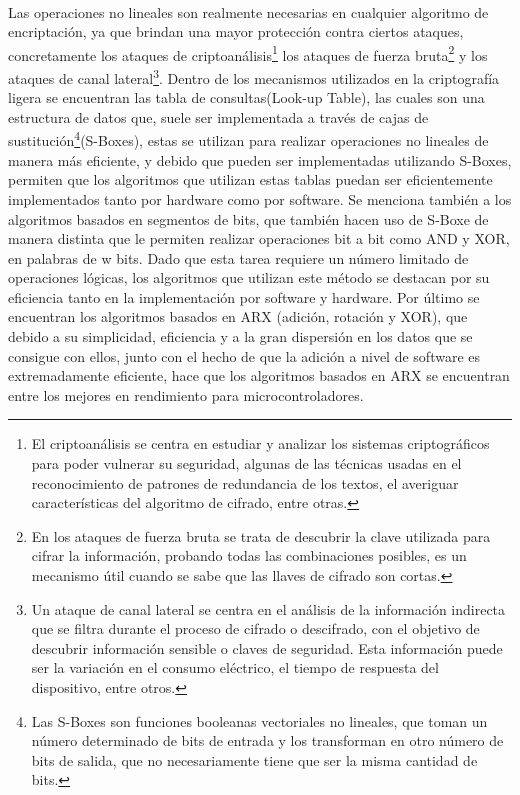 \documentclass[]{article}
\begin{document}
\\ Las operaciones no lineales son realmente necesarias en cualquier algoritmo de encriptación, ya que brindan una mayor protección contra ciertos ataques, concretamente los ataques de criptoanálisis\footnote{El criptoanálisis se centra en estudiar y analizar los sistemas criptográficos para poder vulnerar su seguridad, algunas de las técnicas usadas en el reconocimiento de patrones de redundancia de los textos, el averiguar características del algoritmo de cifrado, entre otras.} los ataques de fuerza bruta\footnote{En los ataques de fuerza bruta se trata de descubrir la clave utilizada para cifrar la información, probando todas las combinaciones posibles, es un mecanismo útil cuando se sabe que las llaves de cifrado son cortas.} y los ataques de canal lateral\footnote{Un ataque de canal lateral se centra en el análisis de la información indirecta que se filtra durante el proceso de cifrado o descifrado, con el objetivo de descubrir información sensible o claves de seguridad. Esta información puede ser la variación en el consumo eléctrico, el tiempo de respuesta del dispositivo, entre otros.}. Dentro de los mecanismos utilizados en la criptografía ligera se encuentran las tabla de consultas(Look-up Table), las cuales son una estructura de datos que, suele ser implementada a través de cajas de sustitución\footnote{Las S-Boxes son funciones booleanas vectoriales no lineales, que toman un número determinado de bits de entrada y los transforman en otro número de bits de salida, que no necesariamente tiene que ser la misma cantidad de bits.}(S-Boxes), estas se utilizan para realizar operaciones no lineales de manera más eficiente, y debido que pueden ser implementadas utilizando S-Boxes, permiten que los algoritmos que utilizan estas tablas puedan ser eficientemente implementados tanto por hardware como por software. Se menciona también a los algoritmos basados en segmentos de bits, que también hacen uso de S-Boxe de manera distinta que le permiten realizar operaciones bit a bit como AND y XOR, en palabras de w bits. Dado que esta tarea requiere un número limitado de operaciones lógicas, los algoritmos que utilizan este método se destacan por su eficiencia tanto en la implementación por software y hardware. Por último se encuentran los algoritmos basados en ARX (adición, rotación y XOR), que debido a su simplicidad, eficiencia y a la gran dispersión en los datos que se consigue con ellos, junto con el hecho de que la adición a nivel de software es extremadamente eficiente, hace que los algoritmos basados en ARX se encuentran entre los mejores en rendimiento para microcontroladores.
\end{document}

